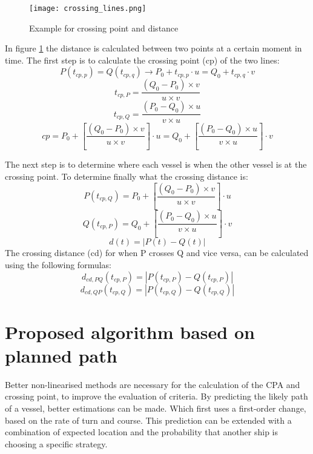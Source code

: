 \begin{figure}[h]
	\centering
	\texttt{[image: crossing\_lines.png]}
	\caption{Example for crossing point and distance}
	\label{fig:crossing-distance}
\end{figure}

In figure \ref{fig:crossing-distance} the distance is calculated between two points at a certain moment in time. The first step is to calculate the crossing point (cp) of the two lines:
\begin{equation}
P(t_{cp,p}) = Q(t_{cp,q}) \rightarrow P_0 + t_{cp,p} \cdot u = Q_0 + t_{cp,q} \cdot v
\end{equation}
\begin{equation}
t_{cp,P} = \frac{(Q_0 - P_0) \times v}{u \times v}
\end{equation}
\begin{equation}
t_{cp,Q} = \frac{(P_0 - Q_0) \times u}{v \times u}
\end{equation}
\begin{equation}
cp = P_0 + \left[ \frac{(Q_0 - P_0) \times v}{u \times v} \right] \cdot u =  Q_0 + \left[ \frac{(P_0 - Q_0) \times u}{v \times u} \right] \cdot v
\end{equation}

The next step is to determine where each vessel is when the other vessel is at the crossing point. To determine finally what the crossing distance is:
\begin{equation}
P(t_{cp,Q}) = P_0 + \left[ \frac{(Q_0 - P_0) \times v}{u \times v} \right] \cdot u
\end{equation}
\begin{equation}
Q(t_{cp,P}) = Q_0 + \left[ \frac{(P_0 - Q_0) \times u}{v \times u} \right] \cdot v
\end{equation}
\begin{equation}
d(t) = |P(t) - Q(t)|
\end{equation}
The crossing distance (cd) for when P crosses Q and vice versa, can be calculated using the following formulas:
\begin{equation}
d_{cd,PQ}(t_{cp,P}) = |P(t_{cp,P}) - Q(t_{cp,P})|
\end{equation}
\begin{equation}
d_{cd,QP}(t_{cp,Q}) = |P(t_{cp,Q}) - Q(t_{cp,Q})|
\end{equation}

\section{Proposed algorithm based on planned path}
Better non-linearised methods are necessary for the calculation of the \ac{CPA} and crossing point, to improve the evaluation of criteria. By predicting the likely path of a vessel, better estimations can be made. Which first uses a first-order change, based on the rate of turn and course. This prediction can be extended with a combination of expected location and the probability that another ship is choosing a specific strategy.

